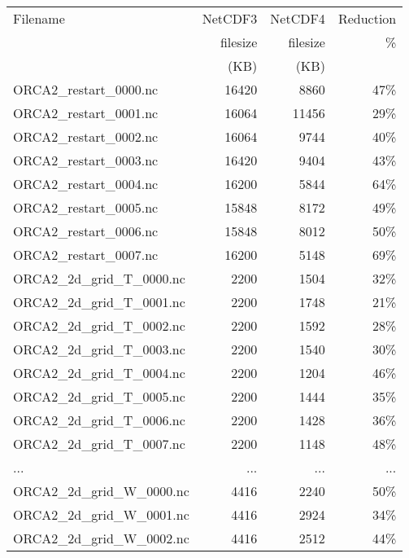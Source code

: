 \documentclass[../main/NEMO_manual]{subfiles}
\begin{document}
\begin{table}
  \scriptsize
  \centering
  \begin{tabular}{lrrr}
    Filename                    & NetCDF3	& NetCDF4  & Reduction \\
                                & filesize	& filesize & \%        \\
                                & (KB)		& (KB)	  &           \\
    ORCA2\_restart\_0000.nc     & 16420 	& 8860 	  & 47\%      \\
    ORCA2\_restart\_0001.nc     & 16064 	& 11456    & 29\%      \\
    ORCA2\_restart\_0002.nc     & 16064		& 9744	  & 40\%      \\
    ORCA2\_restart\_0003.nc     & 16420		& 9404	  & 43\%      \\
    ORCA2\_restart\_0004.nc     & 16200 	& 5844	  & 64\%      \\
    ORCA2\_restart\_0005.nc     & 15848 	& 8172	  & 49\%      \\
    ORCA2\_restart\_0006.nc     & 15848 	& 8012 	  & 50\%      \\
    ORCA2\_restart\_0007.nc     & 16200 	& 5148 	  & 69\%      \\
    ORCA2\_2d\_grid\_T\_0000.nc & 2200 		& 1504	  & 32\%      \\
    ORCA2\_2d\_grid\_T\_0001.nc & 2200 		& 1748	  & 21\%      \\
    ORCA2\_2d\_grid\_T\_0002.nc & 2200 		& 1592	  & 28\%      \\
    ORCA2\_2d\_grid\_T\_0003.nc & 2200 		& 1540	  & 30\%      \\
    ORCA2\_2d\_grid\_T\_0004.nc & 2200 		& 1204	  & 46\%      \\
    ORCA2\_2d\_grid\_T\_0005.nc & 2200 		& 1444	  & 35\%      \\
    ORCA2\_2d\_grid\_T\_0006.nc & 2200 		& 1428	  & 36\%      \\
    ORCA2\_2d\_grid\_T\_0007.nc & 2200		& 1148	  & 48\%      \\
    ...                         & ...		& ...      & ...       \\
    ORCA2\_2d\_grid\_W\_0000.nc & 4416		& 2240	  & 50\%      \\
    ORCA2\_2d\_grid\_W\_0001.nc & 4416		& 2924	  & 34\%      \\
    ORCA2\_2d\_grid\_W\_0002.nc & 4416		& 2512	  & 44\%      \\

\end{tabular}
\end{table}
\end{document}
